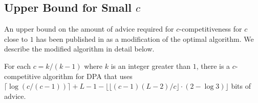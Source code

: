 \subsection{Upper Bound for Small $c$}

An upper bound on the amount of advice required for $c$-competitiveness
for $c$ close to $1$ has been published in \cite{sofsem2014} as a
modification of the optimal algorithm. We describe the modified algorithm
in detail below.

\begin{theorem}\label{theorem:dpa-log3}
    For each $c = k/(k-1)$ where $k$ is an integer greater than $1$, there
    is a $c$-competitive algorithm for DPA that uses
    $\lceil\log(c/(c-1))\rceil + L-1 - \lfloor\lfloor(c-1)(L-2)/c\rfloor
    \cdot (2 - \log 3)\rfloor$ bits of advice.
\end{theorem}

